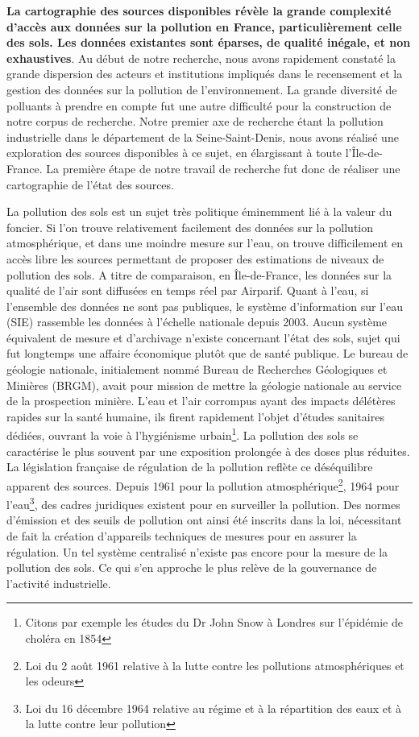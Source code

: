 \documentclass[a4paper,twoside,12pt]{book}
\begin{document}
\textbf{La cartographie des sources disponibles révèle la grande complexité d'accès aux données sur la pollution en France, particulièrement celle des sols. Les données existantes sont éparses, de qualité inégale, et non exhaustives}. Au début de notre recherche, nous avons rapidement constaté la grande dispersion des acteurs et institutions impliqués dans le recensement et la gestion des données sur la pollution de l'environnement. La grande diversité de polluants à prendre en compte fut une autre difficulté pour la construction de notre corpus de recherche. Notre premier axe de recherche étant la pollution industrielle dans le département de la Seine-Saint-Denis, nous avons réalisé une exploration des sources disponibles à ce sujet, en élargissant à toute l'Île-de-France. La première étape de notre travail de recherche fut donc de réaliser une cartographie de l'état des sources. 

La pollution des sols est un sujet très politique éminemment lié à la valeur du foncier. Si l'on trouve relativement facilement des données sur la pollution atmosphérique, et dans une moindre mesure sur l'eau, on trouve difficilement en accès libre les sources permettant de proposer des estimations de niveaux de pollution des sols. A titre de comparaison, en Île-de-France, les données sur la qualité de l'air sont diffusées en temps réel par Airparif. Quant à l'eau, si l'ensemble des données ne sont pas publiques, le système d'information sur l'eau (SIE) rassemble les données à l'échelle nationale depuis 2003. Aucun système équivalent de mesure et d'archivage n'existe concernant l'état des sols, sujet qui fut longtemps une affaire économique plutôt que de santé publique. Le bureau de géologie nationale, initialement nommé Bureau de Recherches Géologiques et Minières (BRGM), avait pour mission de mettre la géologie nationale au service de la prospection minière. L'eau et l'air corrompus ayant des impacts délétères rapides sur la santé humaine, ils firent rapidement l'objet d'études sanitaires dédiées, ouvrant la voie à l'hygiénisme urbain\footnote{Citons par exemple les études du Dr John Snow à Londres sur l'épidémie de choléra en 1854}. La pollution des sols se caractérise le plus souvent par une exposition prolongée à des doses plus réduites. La législation française de régulation de la pollution reflète ce déséquilibre apparent des sources. Depuis 1961 pour la pollution atmosphérique\footnote{Loi du 2 août 1961 relative à la lutte contre les pollutions atmosphériques et les odeurs}, 1964 pour l'eau\footnote{Loi du 16 décembre 1964 relative au régime et à la répartition des eaux et à la lutte contre leur pollution}, des cadres juridiques existent pour en surveiller la pollution. Des normes d'émission et des seuils de pollution ont ainsi été inscrits dans la loi, nécessitant de fait la création d'appareils techniques de mesures pour en assurer la régulation. Un tel système centralisé n'existe pas encore pour la mesure de la pollution des sols. Ce qui s'en approche le plus relève de la gouvernance de l'activité industrielle.  
 
\end{document}
